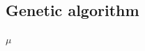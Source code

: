 \documentclass[a4paper]{IEEEtran}
\begin{document}
\subsection{Genetic algorithm}$ \mu  $


%


\appendices





\end{document}
